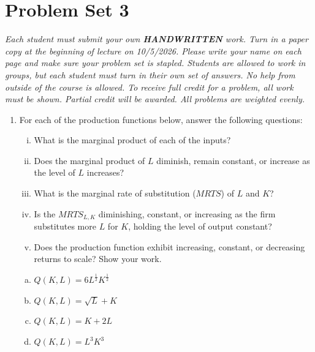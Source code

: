 \documentclass[11pt]{article}
\begin{document}
  
\section*{Problem Set 3}

\emph{Each student must submit your own \textbf{HANDWRITTEN} work. Turn in a paper copy at the beginning of lecture on 10/5/2026.  Please write your name on each page and make sure your problem set is stapled.  Students are allowed to work in groups, but each student must turn in their own set of answers.  No help from outside of the course is allowed.  To receive full credit for a problem, all work must be shown.  Partial credit will be awarded.  All problems are weighted evenly.}


\begin{enumerate}
  \item For each of the production functions below, answer the following questions:
  \begin{enumerate}[(i)]
    \item What is the marginal product of each of the inputs?
    
    \item Does the marginal product of $L$ diminish, remain constant, or increase as the level of $L$ increases?
    
    \item What is the marginal rate of substitution ($MRTS$) of $L$ and $K$?
    
    \item Is the $MRTS_{L,K}$ diminishing, constant, or increasing as the firm substitutes more $L$ for $K$, holding the level of output constant?
    
    \item Does the production function exhibit increasing, constant, or decreasing returns to scale? Show your work.
  \end{enumerate}

  \begin{enumerate}[(a)]
    \item $Q(K, L) = 6 L^{\frac{1}{2}} K^{\frac{1}{2}}$

\newpage     
    \item $Q(K, L) = \sqrt{L} + K$
    
    \vspace*{100mm}
    \item $Q(K, L) = K + 2L$

\newpage
	\item $Q(K, L) = L^{3}K^{3}$
  \end{enumerate}


\end{enumerate}
\end{document}
